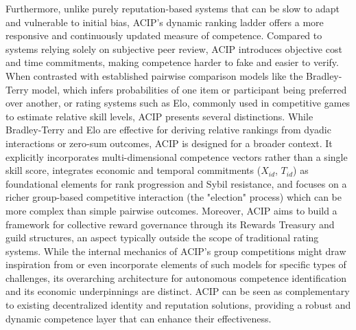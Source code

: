 \documentclass{article}
\begin{document}
\begin{CJK}{UTF8}{gbsn}
        Furthermore, unlike purely reputation-based systems that can be slow to adapt and vulnerable to initial bias, ACIP's dynamic ranking ladder offers a more responsive and continuously updated measure of competence. Compared to systems relying solely on subjective peer review, ACIP introduces objective cost and time commitments, making competence harder to fake and easier to verify. When contrasted with established pairwise comparison models like the Bradley-Terry model, which infers probabilities of one item or participant being preferred over another, or rating systems such as Elo, commonly used in competitive games to estimate relative skill levels, ACIP presents several distinctions. While Bradley-Terry and Elo are effective for deriving relative rankings from dyadic interactions or zero-sum outcomes, ACIP is designed for a broader context. It explicitly incorporates multi-dimensional competence vectors rather than a single skill score, integrates economic and temporal commitments ($X_{id}$, $T_{id}$) as foundational elements for rank progression and Sybil resistance, and focuses on a richer group-based competitive interaction (the "election" process) which can be more complex than simple pairwise outcomes. Moreover, ACIP aims to build a framework for collective reward governance through its Rewards Treasury and guild structures, an aspect typically outside the scope of traditional rating systems. While the internal mechanics of ACIP's group competitions might draw inspiration from or even incorporate elements of such models for specific types of challenges, its overarching architecture for autonomous competence identification and its economic underpinnings are distinct. ACIP can be seen as complementary to existing decentralized identity and reputation solutions, providing a robust and dynamic competence layer that can enhance their effectiveness.


    \clearpage

    
    

    \clearpage\end{CJK}
\end{document}
